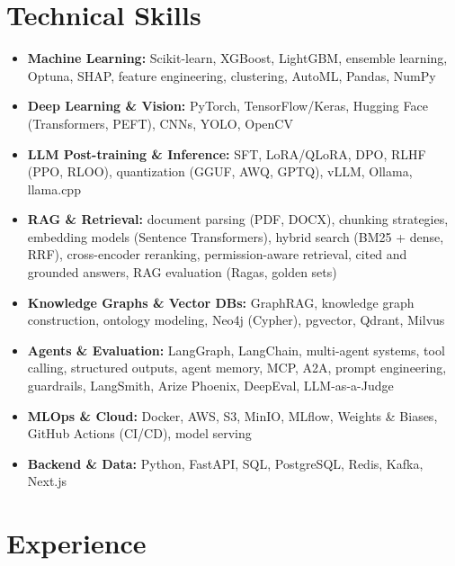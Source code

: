 \documentclass[10pt,a4paper]{article}
\begin{document}
\section*{Technical Skills}
\begin{itemize}
    \item \textbf{Machine Learning:} Scikit-learn, XGBoost, LightGBM, ensemble learning, Optuna, SHAP, feature engineering, clustering, AutoML, Pandas, NumPy
    \item \textbf{Deep Learning \& Vision:} PyTorch, TensorFlow/Keras, Hugging Face (Transformers, PEFT), CNNs, YOLO, OpenCV
    \item \textbf{LLM Post-training \& Inference:} SFT, LoRA/QLoRA, DPO, RLHF (PPO, RLOO), quantization (GGUF, AWQ, GPTQ), vLLM, Ollama, llama.cpp
    \item \textbf{RAG \& Retrieval:} document parsing (PDF, DOCX), chunking strategies, embedding models (Sentence Transformers), hybrid search (BM25 + dense, RRF), cross-encoder reranking, permission-aware retrieval, cited and grounded answers, RAG evaluation (Ragas, golden sets)
    \item \textbf{Knowledge Graphs \& Vector DBs:} GraphRAG, knowledge graph construction, ontology modeling, Neo4j (Cypher), pgvector, Qdrant, Milvus
    \item \textbf{Agents \& Evaluation:} LangGraph, LangChain, multi-agent systems, tool calling, structured outputs, agent memory, MCP, A2A, prompt engineering, guardrails, LangSmith, Arize Phoenix, DeepEval, LLM-as-a-Judge
    \item \textbf{MLOps \& Cloud:} Docker, AWS, S3, MinIO, MLflow, Weights \& Biases, GitHub Actions (CI/CD), model serving
    \item \textbf{Backend \& Data:} Python, FastAPI, SQL, PostgreSQL, Redis, Kafka, Next.js
\end{itemize}

\section*{Experience}
\end{document}

